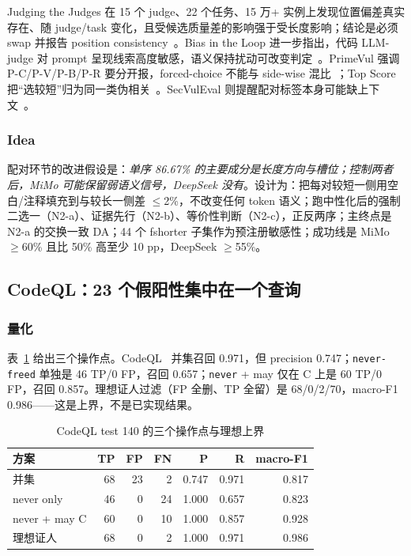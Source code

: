 \documentclass[conference]{IEEEtran}
\begin{document}
Judging the Judges 在 15 个 judge、22 个任务、15 万+ 实例上发现位置偏差真实存在、随 judge/task 变化，且受候选质量差的影响强于受长度影响；结论是必须 swap 并报告 position consistency~\cite{shi2025judges}。Bias in the Loop 进一步指出，代码 LLM-judge 对 prompt 呈现线索高度敏感，语义保持扰动可改变判定~\cite{zhao2026bias}。PrimeVul 强调 P-C/P-V/P-B/P-R 要分开报，forced-choice 不能与 side-wise 混比~\cite{ding2025primevul}；Top Score 把“选较短”归为同一类伪相关~\cite{risse2025topscore}。SecVulEval 则提醒配对标签本身可能缺上下文~\cite{ahmed2026secvuleval}。

\subsubsection{Idea}

配对环节的改进假设是：\emph{单序 86.67\% 的主要成分是长度方向与槽位；控制两者后，MiMo 可能保留弱语义信号，DeepSeek 没有}。设计为：把每对较短一侧用空白/注释填充到与较长一侧差 $\le$2\%，不改变任何 token 语义；跑中性化后的强制二选一（N2-a）、证据先行（N2-b）、等价性判断（N2-c），正反两序；主终点是 N2-a 的交换一致 DA；44 个 fshorter 子集作为预注册敏感性；成功线是 MiMo $\ge$60\% 且比 50\% 高至少 10 pp，DeepSeek $\ge$55\%。

\subsection{CodeQL：23 个假阳性集中在一个查询}
\label{sec:gap-codeql}

\subsubsection{量化}

表~\ref{tab:codeqlbase} 给出三个操作点。CodeQL~\cite{codeqldocs} 并集召回 0.971，但 precision 0.747；\texttt{never-freed} 单独是 46 TP/0 FP，召回 0.657；\texttt{never} + may 仅在 C 上是 60 TP/0 FP，召回 0.857。理想证人过滤（FP 全删、TP 全留）是 68/0/2/70，macro-F1 0.986——这是上界，不是已实现结果。

\begin{table}[t]
\centering
\caption{CodeQL test 140 的三个操作点与理想上界}
\label{tab:codeqlbase}
\footnotesize
\setlength{\tabcolsep}{3pt}
\begin{tabular}{@{}lrrrrrr@{}}
\toprule
方案 & TP & FP & FN & P & R & macro-F1 \\
\midrule
并集 & 68 & 23 & 2 & 0.747 & 0.971 & 0.817 \\
never only & 46 & 0 & 24 & 1.000 & 0.657 & 0.823 \\
never + may C & 60 & 0 & 10 & 1.000 & 0.857 & 0.928 \\
理想证人 & 68 & 0 & 2 & 1.000 & 0.971 & 0.986 \\
\bottomrule
\end{tabular}
\end{table}
\end{document}
